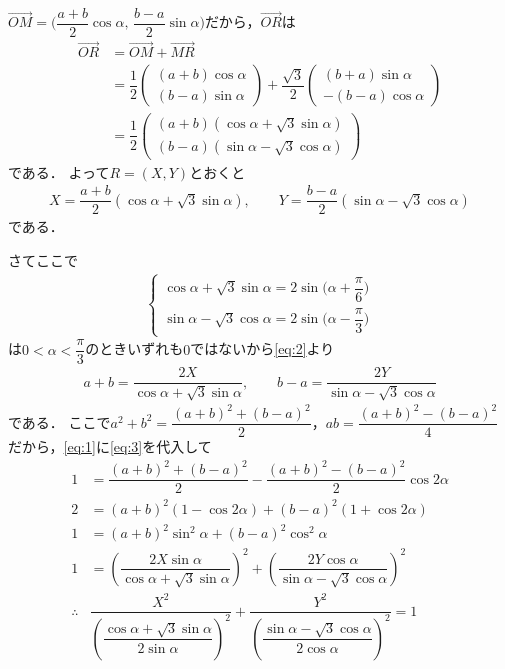 \documentclass[../../main.tex]{subfiles}
\begin{document}
$\overrightarrow{OM}=\bigl(\dfrac{a+b}{2}\cos\alpha,\,\dfrac{b-a}{2}\sin\alpha\bigr)$だから，$\overrightarrow{OR}$は
\begin{align}
  \overrightarrow{OR}
  &=\overrightarrow{OM}+\overrightarrow{MR} \\
  &=\dfrac{1}{2}
  \begin{pmatrix}(a+b)\cos\alpha\\ (b-a)\sin\alpha
  \end{pmatrix}+\dfrac{\sqrt{3}}{2}
  \begin{pmatrix}(b+a)\sin\alpha\\ -(b-a)\cos\alpha
  \end{pmatrix} \\
  &=\dfrac{1}{2}
  \begin{pmatrix}(a+b)(\cos\alpha+\sqrt{3}\sin\alpha)\\ (b-a)(\sin\alpha-\sqrt{3}\cos\alpha)
  \end{pmatrix}
\end{align}
である．
よって$R=(X,Y)$とおくと
\begin{align}
  X=\dfrac{a+b}{2}(\cos\alpha+\sqrt{3}\sin\alpha),\qquad Y=\dfrac{b-a}{2}(\sin\alpha-\sqrt{3}\cos\alpha) \label{eq:2}
\end{align}
である．

さてここで
\begin{align}
  \begin{cases}
    \cos\alpha+\sqrt{3}\sin\alpha = 2\sin\bigl(\alpha+\dfrac{\pi}{6}\bigr) \\
    \sin\alpha-\sqrt{3}\cos\alpha = 2\sin\bigl(\alpha-\dfrac{\pi}{3}\bigr)
  \end{cases}
\end{align}
は$0<\alpha<\dfrac{\pi}{3}$のときいずれも$0$ではないから\cref{eq:2}より
\begin{align}
  a+b=\dfrac{2X}{\cos\alpha+\sqrt{3}\sin\alpha},\qquad b-a=\dfrac{2Y}{\sin\alpha-\sqrt{3}\cos\alpha} \label{eq:3}
\end{align}
である．
ここで$a^2+b^2=\dfrac{(a+b)^2+(b-a)^2}{2}$，$ab=\dfrac{(a+b)^2-(b-a)^2}{4}$だから，\cref{eq:1}に\cref{eq:3}を代入して
\begin{align}
  1&=\dfrac{(a+b)^2+(b-a)^2}{2}-\dfrac{(a+b)^2-(b-a)^2}{2}\cos2\alpha \\
  2&=(a+b)^2(1-\cos2\alpha)+(b-a)^2(1+\cos2\alpha) \\
  1&=(a+b)^2\sin^2\alpha+(b-a)^2\cos^2\alpha \\
  1&=\left(\dfrac{2X\sin\alpha}{\cos\alpha+\sqrt{3}\sin\alpha}\right)^2 + \left(\dfrac{2Y\cos\alpha}{\sin\alpha-\sqrt{3}\cos\alpha}\right)^2 \\
  \therefore
  & \dfrac{X^2}{\left(\dfrac{\cos\alpha+\sqrt{3}\sin\alpha}{2\sin\alpha}\right)^2} + \dfrac{Y^2}{\left(\dfrac{\sin\alpha-\sqrt{3}\cos\alpha}{2\cos\alpha}\right)^2} = 1
\end{align}
\end{document}

